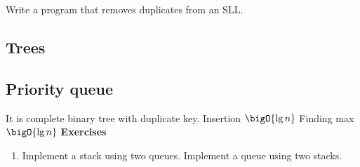 \begin{example}
    Write a program that removes duplicates from an SLL.
\end{example}

\subsection{Trees}

\subsection{Priority queue}
It is complete binary tree with duplicate key.
Insertion \(\bigO{\lg n}\)
Finding max \(\bigO{\lg n}\)
{\Large\textbf{Exercises}}
\begin{enumerate}
    \item Implement a stack using two queues. Implement a queue using two stacks.
\end{enumerate}
\newpage
